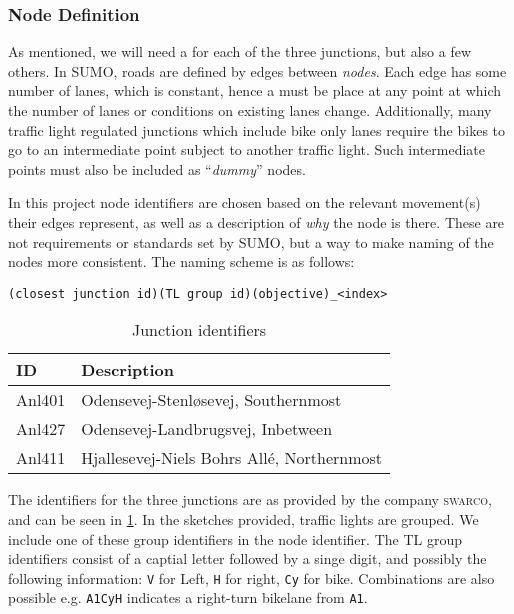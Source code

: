 
\subsubsection{Node Definition}

As mentioned, we will need a \tnode for each of the three junctions, but also a
few others.
In SUMO, roads are defined by edges between \textit{nodes}. Each edge has some
number of lanes, which is constant, hence a \tnode must be place at any point at
which the number of lanes or conditions on existing lanes change.
Additionally, many traffic light regulated junctions which include bike only
lanes require the bikes to go to an intermediate point subject to another
traffic light. Such intermediate points must also be included as ``\textit{dummy}''
nodes.

In this project node identifiers are chosen based on the relevant movement(s)
their edges represent, as well as a description of \textit{why} the node is
there. These are not requirements or standards set by SUMO, but a way to make
naming of the nodes more consistent. The naming scheme is as follows:

\begin{verbatim}
(closest junction id)(TL group id)(objective)_<index>
\end{verbatim}

\begin{table}[!htb]
  \centering
  \begin{tabular}{|l|l|}\hline
    ID & Description \\\hline
    Anl401 & Odensevej-Stenløsevej, Southernmost\\
    Anl427 & Odensevej-Landbrugsvej, Inbetween\\
    Anl411 & Hjallesevej-Niels Bohrs Allé, Northernmost\\\hline
  \end{tabular}
  \caption{Junction identifiers}\label{tab:jid}
\end{table}

The identifiers for the three junctions are as provided by the company
\textsc{swarco}, and can be seen in \cref{tab:jid}. In the sketches provided, traffic lights are grouped. We
include one of these group identifiers in the node identifier. The TL group
identifiers consist of a captial letter followed by a singe digit, and possibly
the following information: \texttt{V} for Left, \texttt{H} for right,
\texttt{Cy} for bike. Combinations are also possible e.g. \texttt{A1CyH}
indicates a right-turn bikelane from \texttt{A1}.\\


